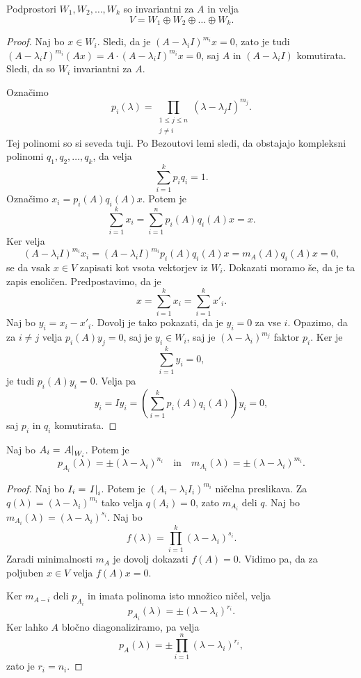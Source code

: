 \documentclass[12pt, a4paper]{article}
\begin{document}
\begin{trditev}
Podprostori $W_1,W_2,\dots,W_k$ so invariantni za $A$ in velja
\[
V=W_1\oplus W_2\oplus\dots\oplus W_k.
\]
\end{trditev}

\begin{proof}
Naj bo $x\in W_i$. Sledi, da je $(A-\lambda_i I)^{m_i}x=0$, zato je tudi $(A-\lambda_i I)^{m_i}(Ax)=A\cdot (A-\lambda_i I)^{m_i}x=0$, saj $A$ in $(A-\lambda_i I)$ komutirata. Sledi, da so $W_i$ invariantni za $A$.

Označimo
\[
p_i(\lambda)=\prod_{\substack{1\leq j\leq n \\ j\ne i}}(\lambda-\lambda_j I)^{m_j}.
\]
Tej polinomi so si seveda tuji. Po Bezoutovi lemi sledi, da obstajajo kompleksni polinomi $q_1,q_2,\dots,q_k$, da velja
\[
\sum_{i=1}^k p_iq_i=1.
\]
Označimo $x_i=p_i(A)q_i(A)x$. Potem je
\[
\sum_{i=1}^k x_i=\sum_{i=1}^n p_i(A)q_i(A)x=x.
\]
Ker velja
\[
(A-\lambda_i I)^{m_i}x_i=(A-\lambda_i I)^{m_i}p_i(A)q_i(A)x=m_A(A)q_i(A)x=0,
\]
se da vsak $x\in V$ zapisati kot vsota vektorjev iz $W_i$. Dokazati moramo še, da je ta zapis enoličen. Predpostavimo, da je
\[
x=\sum_{i=1}^k x_i=\sum_{i=1}^k x'_i.
\]
Naj bo $y_i=x_i-x'_i$. Dovolj je tako pokazati, da je $y_i=0$ za vse $i$. Opazimo, da za $i\ne j$ velja $p_i(A)y_j=0$, saj je $y_i\in W_i$, saj je $(\lambda-\lambda_i)^{m_j}$ faktor $p_i$. Ker je
\[
\sum_{i=1}^k y_i=0,
\]
je tudi $p_i(A)y_i=0$. Velja pa
\[
y_i=Iy_i=\left(\sum_{i=1}^k p_i(A)q_i(A)\right)y_i=0,
\]
saj $p_i$ in $q_i$ komutirata.
\end{proof}

\begin{trditev}
Naj bo $A_i=\left. A\right|_{W_i}^{}$. Potem je
\[
p_{A_i}(\lambda)=\pm(\lambda-\lambda_i)^{n_i}\quad\text{in}\quad m_{A_i}(\lambda)=\pm(\lambda-\lambda_i)^{m_i}.
\]
\end{trditev}

\begin{proof}
Naj bo $I_i=\left. I\right|_{i}^{}$. Potem je $(A_i-\lambda_iI_i)^{m_i}$ ničelna preslikava. Za $q(\lambda)=(\lambda-\lambda_i)^{m_i}$ tako velja $q(A_i)=0$, zato $m_{A_i}$ deli $q$. Naj bo $m_{A_i}(\lambda)=(\lambda-\lambda_i)^{s_i}$. Naj bo
\[
f(\lambda)=\prod_{i=1}^k(\lambda-\lambda_i)^{s_i}.
\]
Zaradi minimalnosti $m_A$ je dovolj dokazati $f(A)=0$. Vidimo pa, da za poljuben $x\in V$ velja $f(A)x=0$.

Ker $m_{A-i}$ deli $p_{A_i}$ in imata polinoma isto množico ničel, velja
\[
p_{A_i}(\lambda)=\pm(\lambda-\lambda_i)^{r_i}.
\]
Ker lahko $A$ bločno diagonaliziramo, pa velja
\[
p_A(\lambda)=\pm\prod_{i=1}^n(\lambda-\lambda_i)^{r_i},
\]
zato je $r_i=n_i$.
\end{proof}
\end{document}
